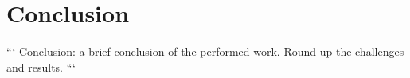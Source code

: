 \section{Conclusion}

```
Conclusion: a brief conclusion of the performed work.
Round up the challenges and results.
```
